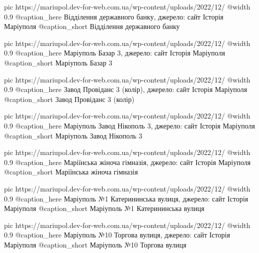 	pic https://mariupol.dev-for-web.com.ua/wp-content/uploads/2022/12/%
	@width 0.9
	@caption_here Відділення державного банку, джерело: сайт Історія Маріуполя
	@caption_short Відділення державного банку

	pic https://mariupol.dev-for-web.com.ua/wp-content/uploads/2022/12/%
	@width 0.9
	@caption_here Маріуполь Базар 3, джерело: сайт Історія Маріуполя
	@caption_short Маріуполь Базар 3

	pic https://mariupol.dev-for-web.com.ua/wp-content/uploads/2022/12/%
	@width 0.9
	@caption_here Завод Провіданс 3 (колір), джерело: сайт Історія Маріуполя
	@caption_short Завод Провіданс 3 (колір)

	pic https://mariupol.dev-for-web.com.ua/wp-content/uploads/2022/12/%
	@width 0.9
	@caption_here Маріуполь Завод Нікополь 3, джерело: сайт Історія Маріуполя
	@caption_short Маріуполь Завод Нікополь 3

	pic https://mariupol.dev-for-web.com.ua/wp-content/uploads/2022/12/%
	@width 0.9
	@caption_here Маріїнська жіноча гімназія, джерело: сайт Історія Маріуполя
	@caption_short Маріїнська жіноча гімназія

	pic https://mariupol.dev-for-web.com.ua/wp-content/uploads/2022/12/%
	@width 0.9
	@caption_here Маріуполь №1 Катерининська вулиця, джерело: сайт Історія Маріуполя
	@caption_short Маріуполь №1 Катерининська вулиця

	pic https://mariupol.dev-for-web.com.ua/wp-content/uploads/2022/12/%
	@width 0.9
	@caption_here Маріуполь №10 Торгова вулиця, джерело: сайт Історія Маріуполя
	@caption_short Маріуполь №10 Торгова вулиця

